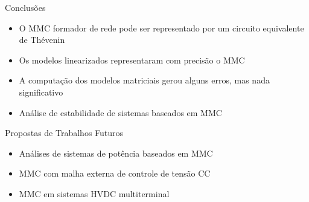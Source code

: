 


\begin{frame}{Conclusões}

\begin{itemize}

	\item O MMC formador de rede pode ser representado por um circuito equivalente de Thévenin\\[30pt]

	\item Os modelos linearizados representaram com precisão o MMC\\[30pt]
	
	\item A computação dos modelos matriciais gerou alguns erros, mas nada significativo\\[30pt]
	
	\item Análise de estabilidade de sistemas baseados em MMC
\end{itemize}

\end{frame}






\begin{frame}{Propostas de Trabalhos Futuros}

\begin{itemize}
	\item Análises de sistemas de potência baseados em MMC\\[40pt]
	
	\item MMC com malha externa de controle de tensão CC\\[40pt]
	
	\item MMC em sistemas HVDC multiterminal\\[30pt]
	
\end{itemize}

\end{frame}